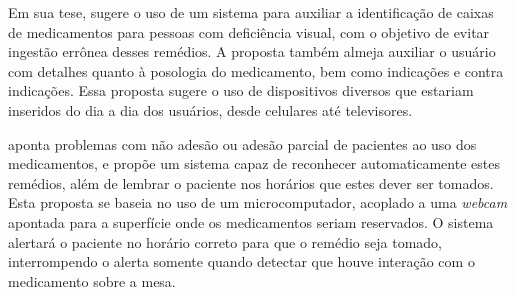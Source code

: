 Em sua tese, \citeauthor{benjamim2012identificaccao} \cite{benjamim2012identificaccao} sugere o uso de um sistema para auxiliar a identificação de caixas de medicamentos para pessoas com deficiência visual, com o objetivo de evitar ingestão errônea desses remédios.
A proposta também almeja auxiliar o usuário com detalhes quanto à posologia do medicamento, bem como indicações e contra indicações.
Essa proposta sugere o uso de dispositivos diversos que estariam inseridos do dia a dia dos usuários, desde celulares até televisores.

\citeauthor{rodrigues2022sisamed} \cite{rodrigues2022sisamed} aponta problemas com não adesão ou adesão parcial de pacientes ao uso dos medicamentos, e propõe um sistema capaz de reconhecer automaticamente estes remédios, além de lembrar o paciente nos horários que estes dever ser tomados.
Esta proposta se baseia no uso de um microcomputador, acoplado a uma \textit{webcam} apontada para a superfície onde os medicamentos seriam reservados.
O sistema alertará o paciente no horário correto para que o remédio seja tomado, interrompendo o alerta somente quando detectar que houve interação com o medicamento sobre a mesa.


